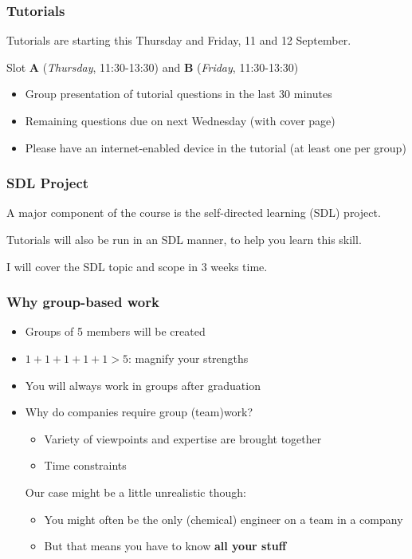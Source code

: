 \begin{frame}\frametitle{Tutorials}
	Tutorials are starting this Thursday and Friday, 11 and 12 September.
	
	\vspace{12pt}
	Slot \textbf{A} (\emph{Thursday}, 11:30-13:30) and \textbf{B} (\emph{Friday}, 11:30-13:30) 

	\begin{itemize}
		\item	Group presentation of tutorial questions in the last 30 minutes
		\item	Remaining questions due on next Wednesday {\scriptsize (with cover page)}
		\item	Please have an internet-enabled device in the tutorial (at least one per group)
	\end{itemize}
\end{frame}

\begin{frame}\frametitle{SDL Project}
	A major component of the course is the self-directed learning (SDL) project.

	\vspace{12pt}
	Tutorials will also be run in an SDL manner, to help you learn this skill.

	\vspace{12pt}
	I will cover the SDL topic and scope in 3 weeks time.
\end{frame}

\begin{frame}\frametitle{Why group-based work}
	\begin{itemize}
		\item	Groups of 5 members will be created
		\item	$1+1+1+1+1 > 5$: magnify your strengths
		\item	You will always work in groups after graduation
		\item	Why do companies require group (team)work? 
		\begin{itemize}
			\item	Variety of viewpoints and expertise are brought together
			\item	Time constraints
		\end{itemize}
		\vspace{12pt}
		\pause
		Our case might be a little unrealistic though:
		\begin{itemize}
			\item	You might often be the only (chemical) engineer on a team in a company
			\item	But that means you have to know \textbf{all your stuff}
		\end{itemize}
	\end{itemize}
\end{frame}


